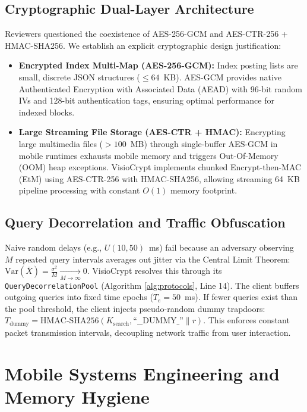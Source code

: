 \documentclass[10pt,conference]{IEEEtran}
\newenvironment{revised}{\color{revcolor}}{}
\newenvironment{revised}{\color{revcolor}}{}
\begin{document}
\begin{revised}
\subsection{Cryptographic Dual-Layer Architecture}
Reviewers questioned the coexistence of AES-256-GCM and AES-CTR-256 + HMAC-SHA256. We establish an explicit cryptographic design justification:
\begin{itemize}
    \item \textbf{Encrypted Index Multi-Map (AES-256-GCM):} Index posting lists are small, discrete JSON structures ($\le 64$~KB). AES-GCM provides native Authenticated Encryption with Associated Data (AEAD) with 96-bit random IVs and 128-bit authentication tags, ensuring optimal performance for indexed blocks.
    \item \textbf{Large Streaming File Storage (AES-CTR + HMAC):} Encrypting large multimedia files ($> 100$~MB) through single-buffer AES-GCM in mobile runtimes exhausts mobile memory and triggers Out-Of-Memory (OOM) heap exceptions. VisioCrypt implements chunked Encrypt-then-MAC (EtM) using AES-CTR-256 with HMAC-SHA256, allowing streaming 64~KB pipeline processing with constant $O(1)$ memory footprint.
\end{itemize}



\subsection{Query Decorrelation and Traffic Obfuscation}
Naive random delays (e.g., $U(10, 50)$~ms) fail because an adversary observing $M$ repeated query intervals averages out jitter via the Central Limit Theorem: $\text{Var}(\bar{X}) = \frac{\sigma^2}{M} \xrightarrow[M \to \infty]{} 0$. VisioCrypt resolves this through its \texttt{QueryDecorrelationPool} (Algorithm \ref{alg:protocols}, Line 14). The client buffers outgoing queries into fixed time epochs ($T_e = 50$~ms). If fewer queries exist than the pool threshold, the client injects pseudo-random dummy trapdoors: $T_{\text{dummy}} = \text{HMAC-SHA256}(K_{\text{search}}, \text{``\_\_DUMMY\_''}\parallel r)$. This enforces constant packet transmission intervals, decoupling network traffic from user interaction.

\section{Mobile Systems Engineering and Memory Hygiene}
\enlargethispage{2\baselineskip}

\end{revised}
\end{document}

